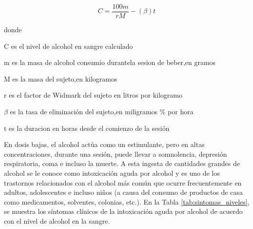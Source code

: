 \begin{equation} \label{eq_bac}
    C=\frac{100m}{rM}-(\beta)t
\end{equation}
\par
donde \par
C es el nivel de alcohol en sangre calculado \par
m es la masa de alcohol consumio durantela sesion de beber,en gramos\par
M es la masa del sujeto,en kilogramos \par
r es el factor de Widmark del sujeto en litros por kilogramo \par
$\beta$ es la tasa de eliminación del sujeto,en miligramos \% por hora \par
t es la duracion en horas desde el comienzo de la sesión \\ \par
En dosis bajas, el alcohol actúa como un estimulante, pero en altas concentraciones, durante una sesión, puede llevar a somnolencia, depresión respiratoria, coma e incluso la muerte. A esta ingesta de cantidades grandes de alcohol se le conoce como intoxicación aguda por alcohol y es uno de los trastornos relacionados con el alcohol más común que ocurre frecuentemente en adultos, adolescentes e incluso niños (a causa del consumo de productos de casa como medicamentos, solventes, colonias, etc.). En la Tabla \ref{tab:sintomas_niveles}, se muestra los síntomas clínicos de la intoxicación aguda por alcohol de acuerdo con el nivel de alcohol en la sangre. \cite{alcohol_brief_overview,alcohol_consumption_and_ethyl,alcohol_calculations} \\ \par
